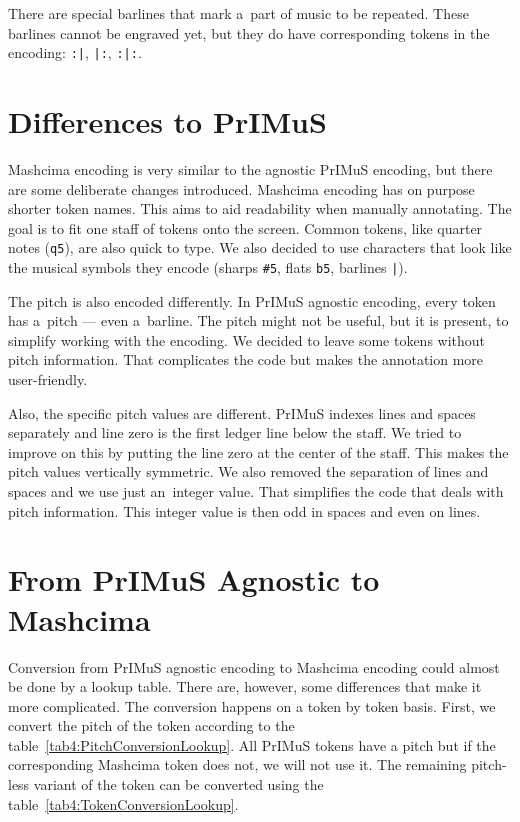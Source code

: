 There are special barlines that mark a~part of music to be repeated. These barlines cannot be engraved yet, but they do have corresponding tokens in the encoding: \verb`:|`, \verb`|:`, \verb`:|:`.


\section{Differences to PrIMuS}

Mashcima encoding is very similar to the agnostic PrIMuS encoding, but there are some deliberate changes introduced. Mashcima encoding has on purpose shorter token names. This aims to aid readability when manually annotating. The goal is to fit one staff of tokens onto the screen. Common tokens, like quarter notes (\verb`q5`), are also quick to type. We also decided to use characters that look like the musical symbols they encode (sharps \verb`#5`, flats \verb`b5`, barlines \verb`|`).

The pitch is also encoded differently. In PrIMuS agnostic encoding, every token has a~pitch --- even a~barline. The pitch might not be useful, but it is present, to simplify working with the encoding. We decided to leave some tokens without pitch information. That complicates the code but makes the annotation more user-friendly.

Also, the specific pitch values are different. PrIMuS indexes lines and spaces separately and line zero is the first ledger line below the staff. We tried to improve on this by putting the line zero at the center of the staff. This makes the pitch values vertically symmetric. We also removed the separation of lines and spaces and we use just an~integer value. That simplifies the code that deals with pitch information. This integer value is then odd in spaces and even on lines.


\section{From PrIMuS Agnostic to Mashcima}

Conversion from PrIMuS agnostic encoding to Mashcima encoding could almost be done by a lookup table. There are, however, some differences that make it more complicated. The conversion happens on a token by token basis. First, we convert the pitch of the token according to the table~\ref{tab4:PitchConversionLookup}. All PrIMuS tokens have a pitch but if the corresponding Mashcima token does not, we will not use it. The remaining pitch-less variant of the token can be converted using the table~\ref{tab4:TokenConversionLookup}.

